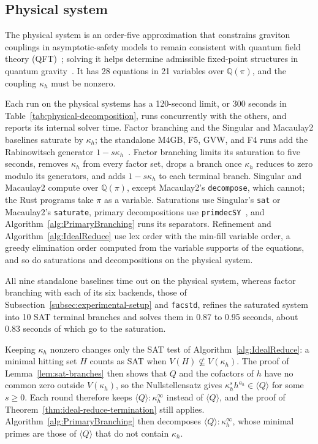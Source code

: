 
\subsection{Physical system}
\label{subsec:physical-system}

The physical system is an order-five approximation that constrains graviton
couplings in asymptotic-safety models to remain consistent with quantum field
theory (QFT)~\cite{rafiezinedine2018simplifying,vacca2010asymptotic}; solving
it helps determine admissible fixed-point structures in quantum
gravity~\cite{vacca2010asymptotic}. It has 28 equations in 21 variables over
$\mathbb Q(\pi)$, and the coupling $\kappa_h$ must be nonzero.

Each run on the physical systems has a 120-second limit, or 300 seconds in
Table~\ref{tab:physical-decomposition}, runs concurrently with the others, and
reports its internal solver time. Factor branching and the Singular and
Macaulay2 baselines saturate by $\kappa_h$; the standalone M4GB, F5, GVW, and
F4 runs add the Rabinowitsch generator
$1-s\kappa_h$~\cite{rabinowitsch1930nullstellensatz}. Factor branching limits
its saturation to five seconds, removes $\kappa_h$ from every factor set, drops
a branch once $\kappa_h$ reduces to zero modulo its generators, and adds
$1-s\kappa_h$ to each terminal branch. Singular and Macaulay2 compute over
$\mathbb Q(\pi)$, except Macaulay2's \texttt{decompose}, which cannot; the Rust
programs take $\pi$ as a variable. Saturations use Singular's \texttt{sat} or
Macaulay2's \texttt{saturate}, primary decompositions use
\texttt{primdecSY}~\cite{shimoyama1996localization}, and
Algorithm~\ref{alg:PrimaryBranching} runs its separators. Refinement and
Algorithm~\ref{alg:IdealReduce} use lex order with the min-fill variable
order, a greedy elimination order computed from the variable supports of the
equations, and so do saturations and decompositions on the physical system.

All nine standalone baselines time out on the physical system, whereas factor
branching with each of its six backends, those of
Subsection~\ref{subsec:experimental-setup} and \texttt{facstd}, refines the
saturated system into 10 SAT terminal branches and solves them in 0.87 to 0.95
seconds, about 0.83 seconds of which go to the saturation.

Keeping $\kappa_h$ nonzero changes only the SAT test of
Algorithm~\ref{alg:IdealReduce}: a minimal hitting set $H$ counts as SAT when
$V(H)\not\subseteq V(\kappa_h)$. The proof of Lemma~\ref{lem:sat-branches}
then shows that $Q$ and the cofactors of $h$ have no common zero outside
$V(\kappa_h)$, so the Nullstellensatz gives
$\kappa_h^sh^{a_h}\in\langle Q\rangle$ for some $s\geq0$. Each round therefore
keeps $\langle Q\rangle:\kappa_h^\infty$ instead of $\langle Q\rangle$, and the
proof of Theorem~\ref{thm:ideal-reduce-termination} still applies.
Algorithm~\ref{alg:PrimaryBranching} then decomposes
$\langle Q\rangle:\kappa_h^\infty$, whose minimal primes are those of
$\langle Q\rangle$ that do not contain $\kappa_h$.

